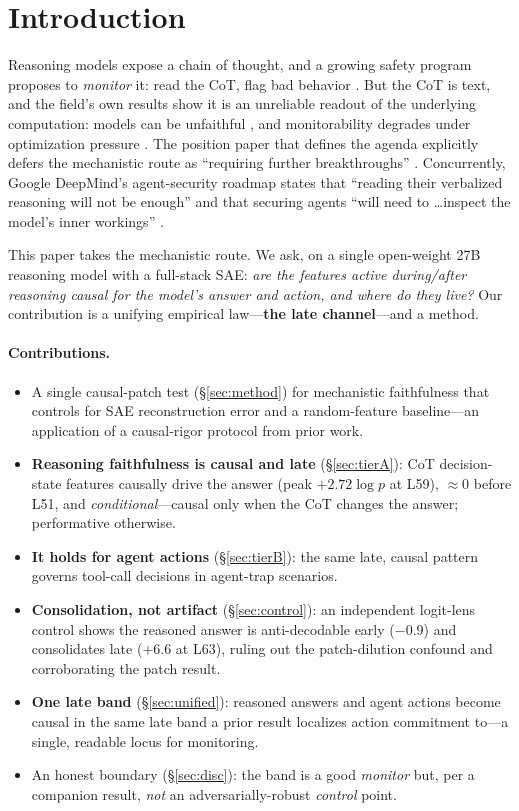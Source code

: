 \documentclass[11pt]{article}
\begin{document}
\section{Introduction}
Reasoning models expose a chain of thought, and a growing safety program proposes to \emph{monitor} it: read
the CoT, flag bad behavior \cite{cotmon2025,baker2025}. But the CoT is text, and the field's own results show it
is an unreliable readout of the underlying computation: models can be unfaithful \cite{turpin2023,anthropic2025},
and monitorability degrades under optimization pressure \cite{cotmon2025,baker2025}. The position paper that
defines the agenda explicitly defers the mechanistic route as ``requiring further breakthroughs''
\cite{cotmon2025}. Concurrently, Google DeepMind's agent-security roadmap states that ``reading their verbalized
reasoning will not be enough'' and that securing agents ``will need to \ldots inspect the model's inner
workings'' \cite{deepmind2026}.

This paper takes the mechanistic route. We ask, on a single open-weight 27B reasoning model with a full-stack
SAE: \emph{are the features active during/after reasoning causal for the model's answer and action, and where
do they live?} Our contribution is a unifying empirical law---\textbf{the late channel}---and a method.

\paragraph{Contributions.}
\begin{itemize}
  \item A single causal-patch test (\S\ref{sec:method}) for mechanistic faithfulness that controls for SAE
  reconstruction error and a random-feature baseline---an application of a causal-rigor protocol from prior work.
  \item \textbf{Reasoning faithfulness is causal and late} (\S\ref{sec:tierA}): CoT decision-state features
  causally drive the answer (peak $+2.72\log p$ at L59), $\approx 0$ before L51, and \emph{conditional}---causal
  only when the CoT changes the answer; performative otherwise.
  \item \textbf{It holds for agent actions} (\S\ref{sec:tierB}): the same late, causal pattern governs tool-call
  decisions in agent-trap scenarios.
  \item \textbf{Consolidation, not artifact} (\S\ref{sec:control}): an independent logit-lens control shows the
  reasoned answer is anti-decodable early ($-0.9$) and consolidates late ($+6.6$ at L63), ruling out the
  patch-dilution confound and corroborating the patch result.
  \item \textbf{One late band} (\S\ref{sec:unified}): reasoned answers and agent actions become causal in the
  same late band a prior result localizes action commitment to---a single, readable locus for monitoring.
  \item An honest boundary (\S\ref{sec:disc}): the band is a good \emph{monitor} but, per a companion result,
  \emph{not} an adversarially-robust \emph{control} point.
\end{itemize}
\end{document}
